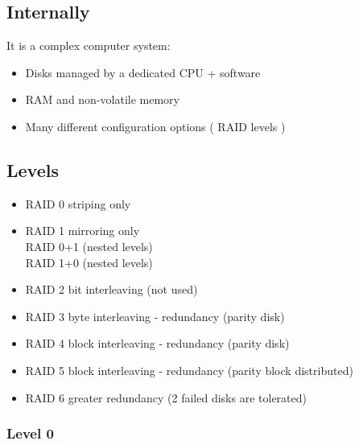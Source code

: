 \documentclass[10pt, oneside]{article}
\begin{document}
\subsection{Internally}
It is a complex computer system:
\begin{itemize}
    \item Disks managed by a dedicated CPU + software 
    \item RAM and non-volatile memory
    \item Many different configuration options ( RAID levels )
\end{itemize}
\subsection{Levels}
\begin{itemize}
    \item RAID 0 striping only
    \item RAID 1 mirroring only\\ RAID 0+1 (nested levels)\\ RAID 1+0 (nested levels)
    \item {\color{lightgray}RAID 2 bit interleaving (not used)}
    \item {\color{lightgray}RAID 3 byte interleaving - redundancy (parity disk)}
    \item RAID 4 block interleaving - redundancy (parity disk)
    \item RAID 5 block interleaving - redundancy (parity block distributed)
    \item RAID 6 greater redundancy (2 failed disks are tolerated)
\end{itemize}

\subsubsection{Level 0}
\end{document}
